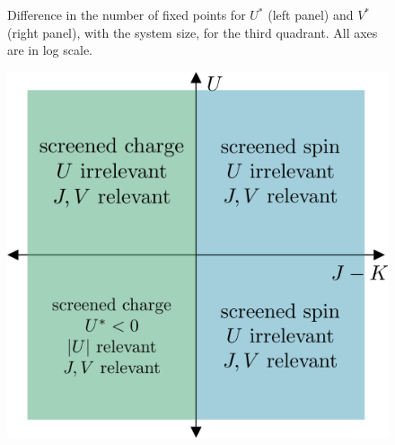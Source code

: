 \documentclass[12pt,twoside]{article}
\numberwithin{equation}{section}
\begin{document}
\begin{figure}[htpb!]
\caption{Difference in the number of fixed points for $U^*$ (left panel) and \(V^*\) (right panel), with the system size, for the third quadrant. All axes are in log scale.}
\label{frac_q3}
\end{figure}

\begin{figure}[htpb]
	\centering
	\includegraphics[scale=0.4]{../figures/phases_V.png}
	\caption{}
\end{figure}
\end{document}
